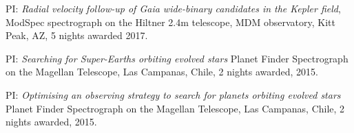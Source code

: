 \documentclass[12pt,letterpaper]{article}
\begin{document}
\begin{list}{}{\cvlist}
\item
PI: {\it Radial velocity follow-up of Gaia wide-binary candidates in the
    Kepler field}, ModSpec spectrograph on the Hiltner 2.4m telescope, MDM
    observatory, Kitt Peak, AZ, 5 nights awarded 2017.
\item
    PI: {\it Searching for Super-Earths orbiting evolved stars} Planet Finder
Spectrograph on the Magellan Telescope, Las Campanas, Chile, 2 nights awarded,
    2015.
\item
PI: {\it Optimising an observing strategy to search for planets orbiting
evolved stars} Planet Finder Spectrograph on the Magellan Telescope, Las
    Campanas, Chile, 2 nights awarded, 2015.
\end{list}
\end{document}
